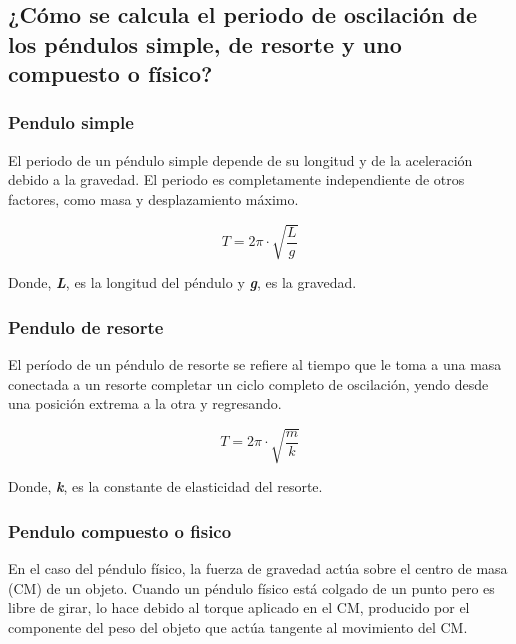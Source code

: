 \documentclass[twocolumn, 12pt]{article}
\newcommand{\bolditalic}[1]{\textbf{\textit{#1}}}
\begin{document}
\nocite{movimiento-armonico-simple}

\subsection{¿Cómo se calcula el periodo de oscilación de los péndulos simple, de resorte y uno compuesto
    o físico?}

\subsubsection{Pendulo simple}

El periodo de un péndulo simple depende de su longitud y de
la aceleración debido a la gravedad. El periodo es
completamente independiente de otros factores, como masa y
desplazamiento máximo.

{\large
\begin{equation}
    T = 2\pi \cdot \sqrt{\frac{L}{g}}
\end{equation}
}

Donde, \bolditalic{L}, es la longitud del péndulo y
\bolditalic{g}, es la gravedad.

\nocite{tipos-pendulos-1}

\subsubsection{Pendulo de resorte}

El período de un péndulo de resorte se refiere al tiempo
que le toma a una masa conectada a un resorte completar un
ciclo completo de oscilación, yendo desde una posición
extrema a la otra y regresando.

    {\large
        \begin{equation}
            T = 2\pi \cdot \sqrt{\frac{m}{k}}
        \end{equation}
    }

Donde, \bolditalic{k}, es la constante de elasticidad del
resorte.

\nocite{tipos-pendulos-2}

\subsubsection{Pendulo compuesto o fisico}

En el caso del péndulo físico, la fuerza de gravedad actúa
sobre el centro de masa (CM) de un objeto. Cuando un
péndulo físico está colgado de un punto pero es libre de
girar, lo hace debido al torque aplicado en el CM,
producido por el componente del peso del objeto que actúa
tangente al movimiento del CM\@.
\end{document}
